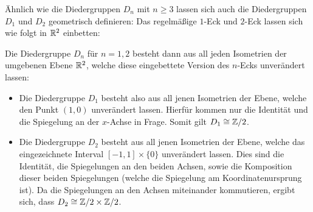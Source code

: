 \begin{remark}
  Ähnlich wie die Diedergruppen $D_n$ mit $n \geq 3$ lassen sich auch die Diedergruppen $D_1$ und $D_2$ geometrisch definieren:
  Das regelmäßige $1$-Eck und $2$-Eck lassen sich wie folgt in $\mathbb{R}^2$ einbetten:
  \begin{center}
    \hspace{2em}
  \end{center}
  Die Diedergruppe $D_n$ für $n = 1, 2$ besteht dann aus all jeden Isometrien der umgebenen Ebene $\mathbb{R}^2$, welche diese eingebettete Version des $n$-Ecks unverändert lassen:
  \begin{itemize}
    \item
      Die Diedergruppe $D_1$ besteht also aus all jenen Isometrien der Ebene, welche den Punkt $(1,0)$ unverändert lassen.
      Hierfür kommen nur die Identität und die Spiegelung an der $x$-Achse in Frage.
      Somit gilt $D_1 \cong \mathbb{Z}/2$.
    \item
      Die Diedergruppe $D_2$ besteht aus all jenen Isometrien der Ebene, welche das eingezeichnete Interval $[-1, 1] \times \{0\}$ unverändert lassen.
      Dies sind die Identität, die Spiegelungen an den beiden Achsen, sowie die Komposition dieser beiden Spiegelungen (welche die Spiegelung am Koordinatenursprung ist).
      Da die Spiegelungen an den Achsen miteinander kommutieren, ergibt sich, dass $D_2 \cong \mathbb{Z}/2 \times \mathbb{Z}/2$.
  \end{itemize}
\end{remark}





